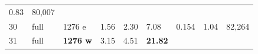 \documentclass[
  10pt, ]{article}
\begin{document}
\begin{longtable}[]{@{}lllllllll@{}}
\begin{minipage}[t]{0.08\columnwidth}
0.83\strut
\end{minipage} & \begin{minipage}[t]{0.08\columnwidth}\raggedright
80,007\strut
\end{minipage}\tabularnewline
\begin{minipage}[t]{0.08\columnwidth}\raggedright
30\strut
\end{minipage} & \begin{minipage}[t]{0.08\columnwidth}\raggedright
full\strut
\end{minipage} & \begin{minipage}[t]{0.08\columnwidth}\raggedright
1276 e\strut
\end{minipage} & \begin{minipage}[t]{0.08\columnwidth}\raggedright
1.56\strut
\end{minipage} & \begin{minipage}[t]{0.08\columnwidth}\raggedright
2.30\strut
\end{minipage} & \begin{minipage}[t]{0.08\columnwidth}\raggedright
7.08\strut
\end{minipage} & \begin{minipage}[t]{0.08\columnwidth}\raggedright
0.154\strut
\end{minipage} & \begin{minipage}[t]{0.08\columnwidth}\raggedright
1.04\strut
\end{minipage} & \begin{minipage}[t]{0.08\columnwidth}\raggedright
82,264\strut
\end{minipage}\tabularnewline
\begin{minipage}[t]{0.08\columnwidth}\raggedright
31\strut
\end{minipage} & \begin{minipage}[t]{0.08\columnwidth}\raggedright
full\strut
\end{minipage} & \begin{minipage}[t]{0.08\columnwidth}\raggedright
\textbf{1276 w}\strut
\end{minipage} & \begin{minipage}[t]{0.08\columnwidth}\raggedright
3.15\strut
\end{minipage} & \begin{minipage}[t]{0.08\columnwidth}\raggedright
4.51\strut
\end{minipage} & \begin{minipage}[t]{0.08\columnwidth}\raggedright
\textbf{21.82}\strut
\end{minipage} & \begin{minipage}[t]{0.08\columnwidth}\raggedright

\end{minipage}
\end{longtable}
\end{document}
